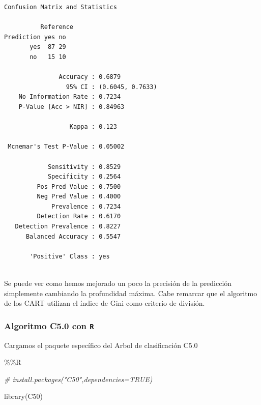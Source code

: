 \documentclass[
  11pt,
  a4paper,
]{article}
\newenvironment{Shaded}{\begin{snugshade}}{\end{snugshade}}
\newcommand{\CommentTok}[1]{\textcolor[rgb]{0.56,0.35,0.01}{\textit{#1}}}
\newcommand{\FunctionTok}[1]{\textcolor[rgb]{0.00,0.00,0.00}{#1}}
\newcommand{\NormalTok}[1]{#1}
\newcommand{\SpecialCharTok}[1]{\textcolor[rgb]{0.00,0.00,0.00}{#1}}
\begin{document}
\begin{verbatim}
Confusion Matrix and Statistics

          Reference
Prediction yes no
       yes  87 29
       no   15 10
                                          
               Accuracy : 0.6879          
                 95% CI : (0.6045, 0.7633)
    No Information Rate : 0.7234          
    P-Value [Acc > NIR] : 0.84963         
                                          
                  Kappa : 0.123           
                                          
 Mcnemar's Test P-Value : 0.05002         
                                          
            Sensitivity : 0.8529          
            Specificity : 0.2564          
         Pos Pred Value : 0.7500          
         Neg Pred Value : 0.4000          
             Prevalence : 0.7234          
         Detection Rate : 0.6170          
   Detection Prevalence : 0.8227          
      Balanced Accuracy : 0.5547          
                                          
       'Positive' Class : yes             
                                          
\end{verbatim}

Se puede ver como hemos mejorado un poco la precisión de la predicción
simplemente cambiando la profundidad máxima. Cabe remarcar que el
algoritmo de los CART utilizan el índice de Gini como criterio de
división.

\newpage

\hypertarget{algoritmo-c5.0-con-r}{%
\subsubsection{\texorpdfstring{Algoritmo C5.0 con \texttt{R}
}{Algoritmo C5.0 con R }}\label{algoritmo-c5.0-con-r}}

Cargamos el paquete específico del Arbol de clasificación C5.0

\begin{Shaded}
\begin{Highlighting}[]
\SpecialCharTok{\%\%}\NormalTok{R}

\CommentTok{\# install.packages("C50",dependencies=TRUE)}

\FunctionTok{library}\NormalTok{(C50)}
\end{Highlighting}
\end{Shaded}
\end{document}
